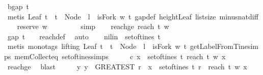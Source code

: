 \begin{isabellebody}
\ b{\isacharcolon}{\isachardoublequoteopen}gap\ t\ {\isacharbrackleft}{\isacharbrackright}\ {\isacharequal}\ {}{\isachardoublequoteclose}\isanewline
\ \ \ \ \isamarkupfalse%
\ {\isacharparenleft}metis\ {\isacartoucheopen}Leaf\ t\ {\isasymand}\ t\ {\isacharequal}\ Node\ {}\ l\ {\isasymand}\ isFork\ w\ t{\isacartoucheclose}\ gap{\isacharunderscore}def\ height{\isacharunderscore}Leaf\ list{\isachardot}size{\isacharparenleft}{}{\isacharparenright}\ minus{\isacharunderscore}nat{\isachardot}diff{\isacharunderscore}{}{\isacharparenright}\isanewline
\ \ \isamarkupfalse%
\ {\isachardoublequoteopen}reserve\ w\ {\isacharbrackleft}{\isacharbrackright}\ {\isasymge}\ {}{\isachardoublequoteclose}\isanewline
\ \ \ \ \isamarkupfalse%
\ simp\isanewline
\ \ \isamarkupfalse%
\ reachge{}{\isacharcolon}\ {\isachardoublequoteopen}reach\ t\ w\ {\isacharbrackleft}{\isacharbrackright}\ {\isasymge}\ {}{\isachardoublequoteclose}\ \isanewline
\ \ \ \ \isamarkupfalse%
\ {\isacartoucheopen}gap\ t\ {\isacharbrackleft}{\isacharbrackright}\ {\isacharequal}\ {}{\isacartoucheclose}\ reach{\isacharunderscore}def\ \isamarkupfalse%
\ auto\isanewline
\ \ \isamarkupfalse%
\ nilin{\isacharcolon}{\isachardoublequoteopen}{\isacharbrackleft}{\isacharbrackright}\ {\isasymin}\ set{\isacharunderscore}of{\isacharunderscore}tines\ t{\isachardoublequoteclose}\isanewline
{}\isamarkupfalse%
\ {\isacharparenleft}metis\ {\isacharparenleft}mono{\isacharunderscore}tags{\isacharcomma}\ lifting{\isacharparenright}\ {\isacartoucheopen}Leaf\ t\ {\isasymand}\ t\ {\isacharequal}\ Node\ {}\ l\ {\isasymand}\ isFork\ w\ t{\isacartoucheclose}\ getLabelFromTine{\isachardot}simps{\isacharparenleft}{}{\isacharparenright}\ mem{\isacharunderscore}Collect{\isacharunderscore}eq\ set{\isacharunderscore}of{\isacharunderscore}tines{\isachardot}simps{\isacharparenright}\isanewline
\ \ \isamarkupfalse%
\ \isamarkupfalse%
\ c{\isacharcolon}{\isachardoublequoteopen}{\isasymexists}\ x\ {\isasymin}\ set{\isacharunderscore}of{\isacharunderscore}tines\ t{\isachardot}\ reach\ t\ w\ x\ {\isasymge}\ {}{\isachardoublequoteclose}\isanewline
\ \ \ \ \isamarkupfalse%
\ reachge{}\ \isamarkupfalse%
\ blast\isanewline
\ \ \isamarkupfalse%
\ \isamarkupfalse%
\ {\isachardoublequoteopen}{\isasymexists}y{\isachardot}\ y\ {\isacharequal}\ {\isacharparenleft}GREATEST\ r{\isachardot}\ {\isasymexists}\ x\ {\isasymin}\ set{\isacharunderscore}of{\isacharunderscore}tines\ t{\isachardot}\ r\ {\isacharequal}\ reach\ t\ w\ x{\isacharparenright}{\isachardoublequoteclose}\isanewline

\end{isabellebody}
